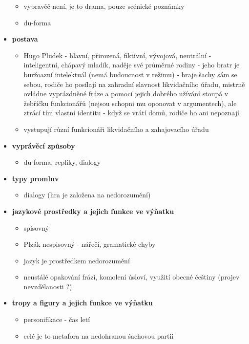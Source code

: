 \documentclass[11pt]{article}
\begin{document}
\begin{itemize}
        \begin{itemize}
            \item vypravěč není, je to drama, pouze scénické poznámky
            \item du-forma
        \end{itemize}
        \item\textbf{postava}
        \begin{itemize}
            \item Hugo Pludek - hlavní, přirozená, fiktivní, vývojová, neutrální - inteligentní, chápavý mladík, naděje své průměrné rodiny - jeho bratr je buržoazní intelektuál (nemá budoucnost v režimu) - hraje šachy sám se sebou, rodiče ho posílají na zahradní slavnost likvidačního úřadu, mistrně ovládne vyprázdněné fráze a pomocí jejich dobrého užívání stoupá v žebříčku funkcionářů (nejsou schopni mu oponovat v argumentech), ale ztrácí tím vlastní identitu - když se vrátí domů, rodiče ho ani nepoznají
            \item vystupují různí funkcionáři likvidačního a zahajovacího úřadu
        \end{itemize}
        \item\textbf{vyprávěcí způsoby}
        \begin{itemize}
            \item du-forma, repliky, dialogy
        \end{itemize}
        \item\textbf{typy promluv}
        \begin{itemize}
            \item dialogy (hra je založena na nedorozumění)
        \end{itemize}
        \item\textbf{jazykové prostředky a jejich funkce ve výňatku}
        \begin{itemize}
            \item spisovný
            \item Plzák nespisovný - nářečí, gramatické chyby
            \item jazyk je prostředkem nedorozumění
            \item neustálé opakování frází, komolení úsloví, využití obecné češtiny (projev nevzdělanosti ?)
        \end{itemize}
        \item\textbf{tropy a figury a jejich funkce ve výňatku}
        \begin{itemize}
            \item personifikace - čas letí
            \item celé je to metafora na nedohranou šachovou partii
        \end{itemize}
    \end{itemize}
\end{document}
